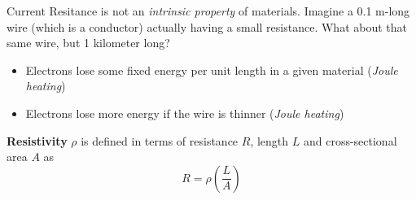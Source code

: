 \documentclass{beamer}
\begin{document}
\begin{frame}{Current}
Resitance is not an \textit{intrinsic property} of materials.  Imagine a 0.1 m-long wire (which is a conductor) actually having a small resistance.  What about that same wire, but 1 kilometer long?
\begin{itemize}
\item Electrons lose some fixed energy per unit length in a given material (\textit{Joule heating})
\item Electrons lose more energy if the wire is thinner (\textit{Joule heating})
\end{itemize}
\textbf{Resistivity} $\rho$ is defined in terms of resistance $R$, length $L$ and cross-sectional area $A$ as
\begin{equation}
R = \rho \left( \frac{L}{A} \right)
\end{equation}
\end{frame}
\end{document}

